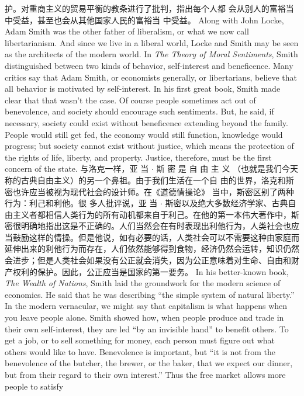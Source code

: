 \begin{paracol}{2}
护。对重商主义的贸易平衡的教条进行了批判，指出每个人都
会从别人的富裕当中受益，甚至也会从其他国家人民的富裕当
中受益。
\switchcolumn*
Along with John Locke, Adam Smith was the other father of
liberalism, or what we now call libertarianism. And since we
live in a liberal world, Locke and Smith may be seen as the architects of the modern world. In \textit{The Theory of Moral Sentiments}, Smith distinguished between two kinds of behavior, self-interest and beneficence. Many critics say that Adam Smith, or economists generally, or libertarians, believe that all behavior is
motivated by self-interest. In his first great book, Smith made
clear that that wasn't the case. Of course people sometimes act
out of benevolence, and society should encourage such sentiments. But, he said, if necessary, society could exist without
beneficence extending beyond the family. People would still get
fed, the economy would still function, knowledge would
progress; but society cannot exist without justice, which means
the protection of the rights of life, liberty, and property. Justice,
therefore, must be the first concern of the state.
\switchcolumn
与洛克一样，亚 当 $\cdot$ 斯 密 是 自 由 主 义 （也就是我们今天
称的古典自由主义）的另一个鼻祖。由于我们生活在一个自
由的世界，洛克和斯密也许应当被视为现代社会的设计师。在《道德情操论》 当中，斯密区别了两种行为：利己和利他。很
多人批评说，亚 当 $\cdot$ 斯密以及绝大多数经济学家、古典自由主义者都相信人类行为的所有动机都来自于利己。在他的第一本伟大著作中，斯密很明确地指出这是不正确的。人们当然会在有时表现出利他行为，人类社会也应当鼓励这样的情操。但是他说，如有必要的话，人类社会可以不需要这种由家庭而延伸出来的利他行为而存在，人们依然能够得到食物，经济仍然会运转，知识仍然会进步；但是人类社会如果没有公正就会消失，因为公正意味着对生命、自由和财产权利的保护。因此，公正应当是国家的第一要务。
\switchcolumn*
In his better-known book, \textit{The Wealth of Nations}, Smith laid
the groundwork for the modern science of economics. He said
that he was describing ``the simple system of natural liberty.'' In
the modern vernacular, we might say that capitalism is what
happens when you leave people alone. Smith showed how, when
people produce and trade in their own self-interest, they are led
``by an invisible hand'' to benefit others. To get a job, or to sell
something for money, each person must figure out what others
would like to have. Benevolence is important, but ``it is not
from the benevolence of the butcher, the brewer, or the baker,
that we expect our dinner, but from their regard to their own
interest.'' Thus the free market allows more people to satisfy

\end{paracol}
